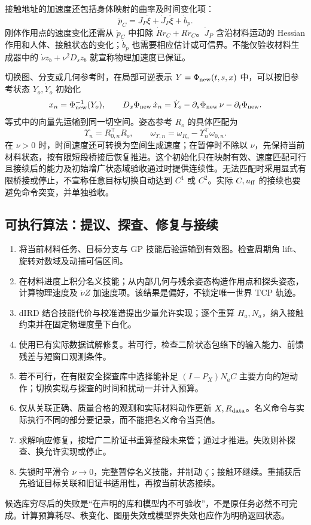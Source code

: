 \documentclass[11pt,a4paper]{article}
\numberwithin{equation}{section}
\theoremstyle{definition}
\begin{document}
接触地址的加速度还包括身体映射的曲率及时间变化项：
\begin{equation}
 \ddot p_C=J_P\ddot\xi+\dot J_P\dot\xi+\dot b_p.
\end{equation}
刚体作用点的速度变化还需从 $\ddot p_C$ 中扣除 $\dot R\dot r_C+R\ddot r_C$。$\dot J_P$ 含沿材料运动的 Hessian 作用和人体、接触状态的变化；$\dot b_p$ 也需要相应估计或可信界。不能仅验收材料生成器中的 $\dot\nu z_b+\nu^2D_sz_b$ 就宣称物理加速度已保证。

切换图、分支或几何参考时，在局部可逆表示 $Y=\Phi_{\rm new}(t,s,x)$ 中，可以按旧参考状态 $Y_o,\dot Y_o$ 初始化
\begin{equation}
 x_n=\Phi_{\rm new}^{-1}(Y_o),\qquad
 D_x\Phi_{\rm new}\,\dot x_n
 =\dot Y_o-\partial_s\Phi_{\rm new}\,\nu-\partial_t\Phi_{\rm new}.
\end{equation}
等式中的向量先运输到同一切空间。姿态参考 $R_o$ 的具体匹配为
\begin{equation}
 \Upsilon_n=R_{0,n}^\top R_o,\qquad
 \omega_{\Upsilon,n}=\omega_{R_o}-\Upsilon_n^\top\omega_{0,n}.
\end{equation}
在 $\nu>0$ 时，时间速度还可转换为空间生成速度；在暂停时不除以 $\nu$，先保持当前材料状态，按有限短段桥接后恢复推进。这个初始化只在映射有效、速度匹配可行且接续后的能力及初始增广状态域验收通过时提供连续性。无法匹配时采用显式有限桥接或停止，不宣称任意目标切换自动达到 $C^1$ 或 $C^2$。实际 $C,u_{\rm ff}$ 的接续也要避免命令突变，并单独验收。

\subsection{可执行算法：提议、探查、修复与接续}
\begin{enumerate}
 \item 将当前材料任务、目标分支与 GP 技能后验运输到有效图。检查周期角 lift、旋转对数域及动捕可信区间。
 \item 在材料进度上积分名义技能；从内部几何与残余姿态构造作用点和探头姿态，计算物理速度及 $\dot\nu Z$ 加速度项。该结果是偏好，不锁定唯一世界 TCP 轨迹。
 \item dIRD 结合技能代价与校准谱提出少量允许实现；逐个重算 $H_a,N_a$，纳入接触约束并在固定物理度量下白化。
 \item 使用已有实际数据试解修复。若可行，检查二阶状态包络下的输入能力、前馈残差与短窗口观测条件。
 \item 若不可行，在有限安全探查库中选择能补足 $(I-P_X)N_aC$ 主要方向的短动作；切换实现与探查的时间和扰动一并计入预算。
 \item 仅从关联正确、质量合格的观测和实际材料动作更新 $X,R_{\rm data}$。名义命令与实际执行不同的部分要记录，而不能把名义命令当真值。
 \item 求解响应修复，按增广二阶证书重算整段未来管；通过才推进。失败则补探查、换允许实现或停止。
 \item 失锁时平滑令 $\nu\to0$，完整暂停名义技能，并制动 $\zeta$；接触环继续。重捕获后先验证目标关联和旧证书适用性，再按当前状态接续。
\end{enumerate}
候选库穷尽后的失败是“在声明的库和模型内不可验收”，不是原任务必然不可完成。计算预算耗尽、秩变化、图册失效或模型界失效也应作为明确返回状态。
\end{document}
